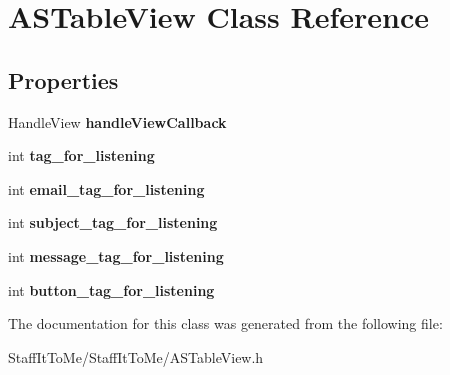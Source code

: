 \hypertarget{interface_a_s_table_view}{
\section{\-A\-S\-Table\-View \-Class \-Reference}
\label{interface_a_s_table_view}
}
\subsection*{\-Properties}
\begin{DoxyCompactItemize}
\item 
\hypertarget{interface_a_s_table_view_af287a66bdfe7e1202509750d21166bac}{
\-Handle\-View {\bfseries handle\-View\-Callback}}
\label{interface_a_s_table_view_af287a66bdfe7e1202509750d21166bac}

\item 
\hypertarget{interface_a_s_table_view_ada970700d01d4d69ca81270eeea06e34}{
int {\bfseries tag\-\_\-for\-\_\-listening}}
\label{interface_a_s_table_view_ada970700d01d4d69ca81270eeea06e34}

\item 
\hypertarget{interface_a_s_table_view_a07a86e8c43973e8abee05dd243b576dc}{
int {\bfseries email\-\_\-tag\-\_\-for\-\_\-listening}}
\label{interface_a_s_table_view_a07a86e8c43973e8abee05dd243b576dc}

\item 
\hypertarget{interface_a_s_table_view_a72ebcbc9bcf10de1ebaf879eaf0a9363}{
int {\bfseries subject\-\_\-tag\-\_\-for\-\_\-listening}}
\label{interface_a_s_table_view_a72ebcbc9bcf10de1ebaf879eaf0a9363}

\item 
\hypertarget{interface_a_s_table_view_a9c23c35df62c7da09e4c7e11cf546425}{
int {\bfseries message\-\_\-tag\-\_\-for\-\_\-listening}}
\label{interface_a_s_table_view_a9c23c35df62c7da09e4c7e11cf546425}

\item 
\hypertarget{interface_a_s_table_view_a75ba78f22db772e94dedd0b71e4d4b49}{
int {\bfseries button\-\_\-tag\-\_\-for\-\_\-listening}}
\label{interface_a_s_table_view_a75ba78f22db772e94dedd0b71e4d4b49}

\end{DoxyCompactItemize}


\-The documentation for this class was generated from the following file\-:\begin{DoxyCompactItemize}
\item 
\-Staff\-It\-To\-Me/\-Staff\-It\-To\-Me/\-A\-S\-Table\-View.\-h\end{DoxyCompactItemize}

